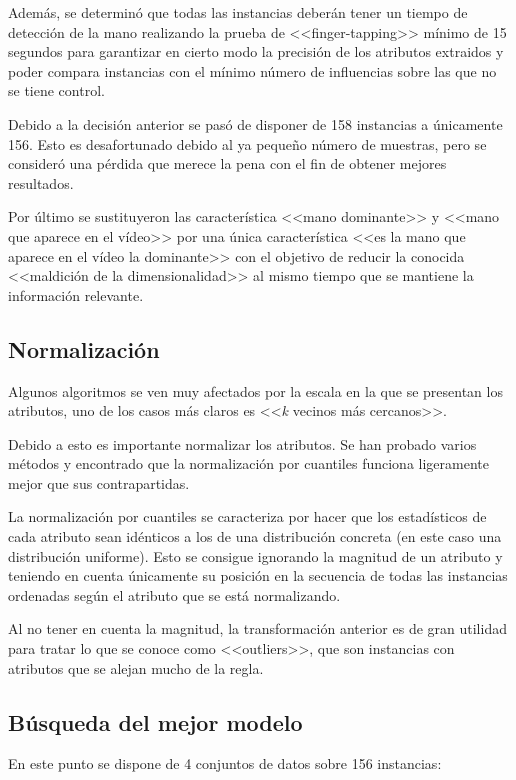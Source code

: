 Además, se determinó que todas las instancias deberán tener un tiempo de
detección de la mano realizando la prueba de <<finger-tapping>> mínimo de 15
segundos para garantizar en cierto modo la precisión de los atributos extraidos
y poder compara instancias con el mínimo número de influencias sobre las que no
se tiene control.

Debido a la decisión anterior se pasó de disponer de 158 instancias a únicamente
156. Esto es desafortunado debido al ya pequeño número de muestras, pero se
consideró una pérdida que merece la pena con el fin de obtener mejores
resultados.

Por último se sustituyeron las característica <<mano dominante>> y <<mano que
aparece en el vídeo>> por una única característica <<es la mano que aparece en
el vídeo la dominante>> con el objetivo de reducir la conocida <<maldición de la
dimensionalidad>> al mismo tiempo que se mantiene la información relevante.

\subsection{Normalización}

Algunos algoritmos se ven muy afectados por la escala en la que se presentan los
atributos, uno de los casos más claros es <<\textit{k} vecinos más cercanos>>.

Debido a esto es importante normalizar los atributos. Se han probado varios
métodos y encontrado que la normalización por cuantiles funciona ligeramente
mejor que sus contrapartidas.

La normalización por cuantiles se caracteriza por hacer que los estadísticos de
cada atributo sean idénticos a los de una distribución concreta (en este caso
una distribución uniforme). Esto se consigue ignorando la magnitud de un
atributo y teniendo en cuenta únicamente su posición en la secuencia de todas
las instancias ordenadas según el atributo que se está normalizando.

Al no tener en cuenta la magnitud, la transformación anterior es de gran
utilidad para tratar lo que se conoce como <<outliers>>, que son instancias con
atributos que se alejan mucho de la regla.

\subsection{Búsqueda del mejor modelo}

En este punto se dispone de 4 conjuntos de datos sobre 156 instancias:

